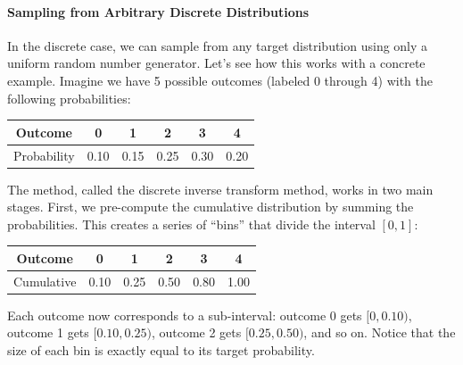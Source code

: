 \paragraph*{Sampling from Arbitrary Discrete Distributions}
In the discrete case, we can sample from any target distribution using only a uniform random number generator. Let's see how this works with a concrete example. Imagine we have 5 possible outcomes (labeled 0 through 4) with the following probabilities:
\begin{center}
\begin{tabular}{c|ccccc}
Outcome & 0 & 1 & 2 & 3 & 4 \\
\hline
Probability & 0.10 & 0.15 & 0.25 & 0.30 & 0.20
\end{tabular}
\end{center}
The method, called the discrete inverse transform method, works in two main stages. First, we pre-compute the cumulative distribution by summing the probabilities. This creates a series of ``bins'' that divide the interval $[0, 1]$:
\begin{center}
\begin{tabular}{c|ccccc}
Outcome & 0 & 1 & 2 & 3 & 4 \\
\hline
Cumulative & 0.10 & 0.25 & 0.50 & 0.80 & 1.00
\end{tabular}
\end{center}
Each outcome now corresponds to a sub-interval: outcome 0 gets $[0, 0.10)$, outcome 1 gets $[0.10, 0.25)$, outcome 2 gets $[0.25, 0.50)$, and so on. Notice that the size of each bin is exactly equal to its target probability.
